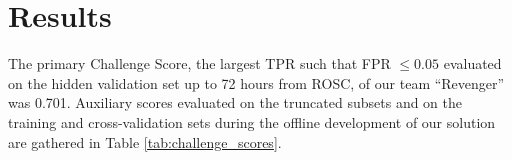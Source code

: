 \section{Results}
\label{sec:results}


The primary Challenge Score, the largest TPR such that FPR $\le 0.05$ evaluated on the hidden validation set up to 72 hours from ROSC, of our team ``Revenger'' was 0.701. Auxiliary scores evaluated on the truncated subsets and on the training and cross-validation sets during the offline development of our solution are gathered in Table \ref{tab:challenge_scores}.


